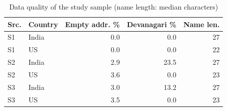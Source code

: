 \begin{table}[t]
\centering
\footnotesize
\caption{Data quality of the study sample (name length: median characters)}
\label{tab:quality}
\begin{tabular}{llrrr}
\toprule
Src. & Country & Empty addr. \% & Devanagari \% & Name len. \\
\midrule
S1 & India & 0.0 & 0.0 & 27 \\
S1 & US & 0.0 & 0.0 & 22 \\
S2 & India & 2.9 & 23.5 & 27 \\
S2 & US & 3.6 & 0.0 & 23 \\
S3 & India & 3.0 & 13.2 & 27 \\
S3 & US & 3.5 & 0.0 & 23 \\
\bottomrule
\end{tabular}
\end{table}
